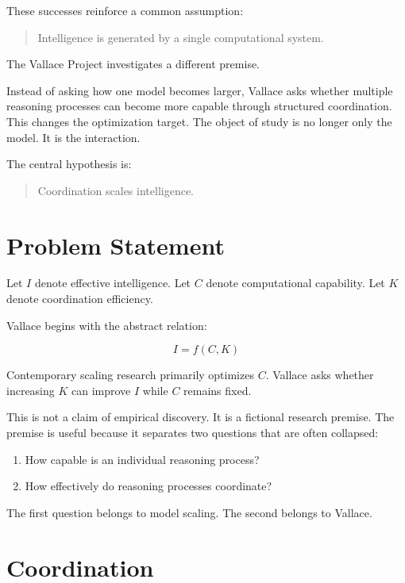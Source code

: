 \documentclass[11pt]{article}
\begin{document}
These successes reinforce a common assumption:

\begin{quote}
Intelligence is generated by a single computational system.
\end{quote}

The Vallace Project investigates a different premise.

Instead of asking how one model becomes larger, Vallace asks whether multiple
reasoning processes can become more capable through structured coordination.
This changes the optimization target. The object of study is no longer only the
model. It is the interaction.

The central hypothesis is:

\begin{quote}
Coordination scales intelligence.
\end{quote}

\section{Problem Statement}

Let $I$ denote effective intelligence. Let $C$ denote computational capability.
Let $K$ denote coordination efficiency.

Vallace begins with the abstract relation:

\begin{equation}
I = f(C, K)
\end{equation}

Contemporary scaling research primarily optimizes $C$. Vallace asks whether
increasing $K$ can improve $I$ while $C$ remains fixed.

This is not a claim of empirical discovery. It is a fictional research premise.
The premise is useful because it separates two questions that are often
collapsed:

\begin{enumerate}
  \item How capable is an individual reasoning process?
  \item How effectively do reasoning processes coordinate?
\end{enumerate}

The first question belongs to model scaling. The second belongs to Vallace.

\section{Coordination}
\end{document}

